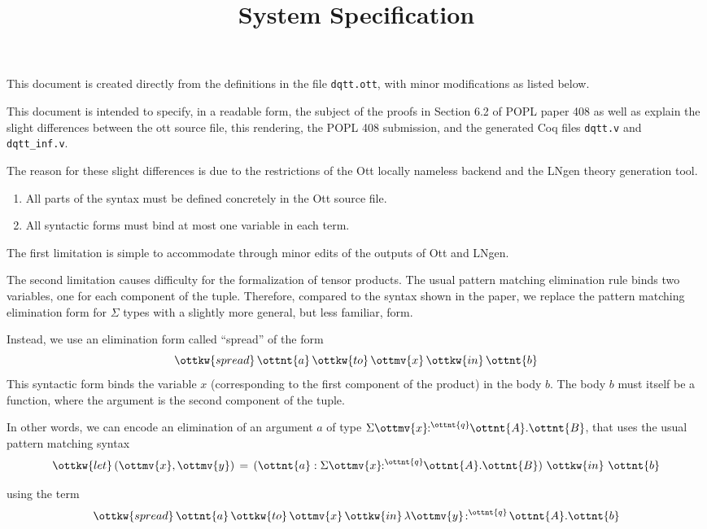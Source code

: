 \documentclass{article}
\title{System Specification}
\begin{document}
\maketitle

This document is created directly from the definitions in the file
{\texttt{dqtt.ott}}, with minor modifications as listed below.

This document is intended to specify, in a readable form, the subject of the
proofs in Section 6.2 of POPL paper 408 as well as explain the slight differences
between the ott source file, this rendering, the POPL 408 submission, and the
generated Coq files \texttt{dqtt.v} and \texttt{dqtt\_inf.v}.

The reason for these slight differences is due to the restrictions of the Ott
locally nameless backend and the LNgen theory generation tool. 
\begin{enumerate}
\item All parts of the syntax must be defined concretely in the Ott source file. 
\item All syntactic forms must bind at most one variable in each term.
\end{enumerate}

The first limitation is simple to accommodate through minor edits of the
outputs of Ott and LNgen.

The second limitation causes difficulty for the formalization of tensor
products. The usual pattern matching elimination rule binds two variables, one
for each component of the tuple.
Therefore, compared to the syntax shown in the paper, we replace
the pattern matching elimination form for $\Sigma$ types with a slightly more
general, but less familiar, form.

Instead, we use an elimination form called ``spread'' of the
form
\[
 \ottkw{spread}\,  \ottnt{a} \, \ottkw{to}\,  \ottmv{x} \, \ottkw{in}\,  \ottnt{b}
\]
This syntactic form binds the variable $x$ (corresponding to the first
component of the product) in the body $b$. The body $b$ must itself be a
function, where the argument is the second component of the tuple.

In other words, we can encode an elimination of an argument $a$
of type $ \Sigma  \ottmv{x} \!\!:^ \ottnt{q} \!\! \ottnt{A} . \ottnt{B} $, that uses
the usual pattern matching syntax
\[ 
     \ottkw{let}\, (\ottmv{x},\ottmv{y}) \,=\, (\ottnt{a} : \Sigma  \ottmv{x} \!\!:^ \ottnt{q} \!\! \ottnt{A} . \ottnt{B}) \ \ottkw{in}\  \ottnt{b} 
\] 

using the term
\[
   \ottkw{spread}\,  \ottnt{a} \, \ottkw{to}\,  \ottmv{x} \, \ottkw{in}\,  \lambda \ottmv{y} \!:^ \ottnt{q} \! \ottnt{A} . \ottnt{b}
\]
\end{document}
